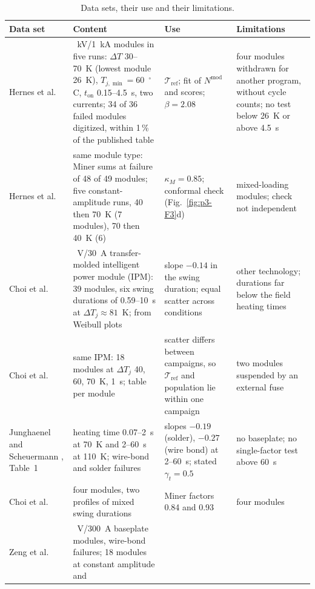 \begin{table}[htbp]
\centering
\caption{Data sets, their use and their limitations.}
\label{tab:S8}
\footnotesize
\begin{tabularx}{\textwidth}{@{}>{\raggedright\arraybackslash}p{2.6cm}>{\raggedright\arraybackslash}X
>{\raggedright\arraybackslash}p{4.1cm}>{\raggedright\arraybackslash}p{4.1cm}@{}}
\toprule
Data set & Content & Use & Limitations \\
\midrule
Hernes et al.\ \cite{hernes2021} & 3.3~kV/1~kA modules in five runs: $\Delta T$ 30--70~K (lowest module 26~K),
$T_{j,\min}=60$~$^\circ$C, $t_{\mathrm{on}}$ 0.15--4.5~s, two currents; 34 of 36 failed modules digitized, within
1\,\% of the published table & $\mathcal T_{\mathrm{ref}}$; fit of $N^{\mathrm{mod}}$ and scores; $\beta=2.08$ & four
modules withdrawn for another program, without cycle counts; no test below 26~K or above 4.5~s \\
\addlinespace
Hernes et al.\ \cite{hernes2021pcim} & same module type: Miner sums at failure of 48 of 49 modules; five
constant-amplitude runs, 40 then 70~K (7 modules), 70 then 40~K (6) & $\kappa_M=0.85$; conformal check
(Fig.~\ref{fig:p3-F3}d) & 13 mixed-loading modules; check not independent \\
\addlinespace
Choi et al.\ \cite{choi2017} & 600~V/30~A transfer-molded intelligent power module (IPM): 39 modules, six swing
durations of 0.59--10~s at $\Delta T_j\approx81$~K; from Weibull plots & slope $-0.14$ in the swing duration; equal
scatter across conditions & other technology; durations far below the field heating times \\
\addlinespace
Choi et al.\ \cite{choi2018mr} & same IPM: 18 modules at $\Delta T_j$ 40, 60, 70~K, 1~s; table per module & scatter
differs between campaigns, so $\mathcal T_{\mathrm{ref}}$ and population lie within one campaign & two modules
suspended by an external fuse \\
\addlinespace
Junghaenel and Scheuermann \cite{junghaenel2017mr}, Table~1 & heating time 0.07--2~s at 70~K and 2--60~s at 110~K;
wire-bond and solder failures & slopes $-0.19$ (solder), $-0.27$ (wire bond) at 2--60~s; stated $\gamma_t=0.5$ &
no baseplate; no single-factor test above 60~s \\
\addlinespace
Choi et al.\ \cite{choi2017apec} & four modules, two profiles of mixed swing durations & Miner factors 0.84 and 0.93 &
four modules \\
\addlinespace
Zeng et al.\ \cite{zeng2019} & 1200~V/300~A baseplate modules, wire-bond failures; 18 modules at constant amplitude and

\end{tabularx}
\end{table}
